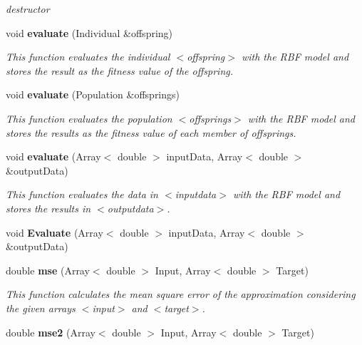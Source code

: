 \begin{CompactItemize}
\begin{CompactList}\small\item\em destructor \item\end{CompactList}\item 
void {\bf evaluate} (Individual \&offspring)
\begin{CompactList}\small\item\em This function evaluates the individual $<$offspring$>$ with the RBF model and stores the result as the fitness value of the offspring. \item\end{CompactList}\item 
void {\bf evaluate} (Population \&offsprings)
\begin{CompactList}\small\item\em This function evaluates the population $<$offsprings$>$ with the RBF model and stores the results as the fitness value of each member of offsprings. \item\end{CompactList}\item 
void {\bf evaluate} (Array$<$ double $>$ input\-Data, Array$<$ double $>$ \&output\-Data)
\begin{CompactList}\small\item\em This function evaluates the data in $<$inputdata$>$ with the RBF model and stores the results in $<$outputdata$>$. \item\end{CompactList}\item 
void {\bf Evaluate} (Array$<$ double $>$ input\-Data, Array$<$ double $>$ \&output\-Data)\label{classRBF_a8}

\item 
double {\bf mse} (Array$<$ double $>$ Input, Array$<$ double $>$ Target)
\begin{CompactList}\small\item\em This function calculates the mean square error of the approximation considering the given arrays $<$input$>$ and $<$target$>$. \item\end{CompactList}\item 
double {\bf mse2} (Array$<$ double $>$ Input, Array$<$ double $>$ Target)\label{classRBF_a10}


\end{CompactItemize}
